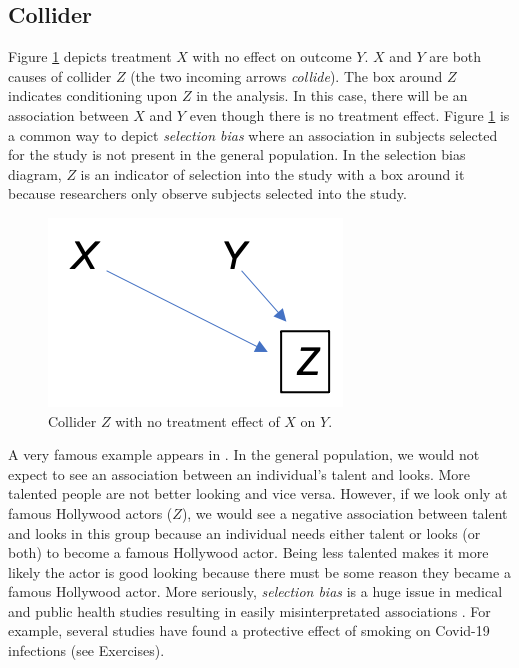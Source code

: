 \documentclass[]{book}
\begin{document}
\hypertarget{collider}{%
\subsection{Collider}\label{collider}}

Figure \ref{fig:collider} depicts treatment \(X\) with no effect on outcome \(Y\). \(X\) and \(Y\) are both causes of collider \(Z\) (the two incoming arrows \emph{collide}). The box around \(Z\) indicates conditioning upon \(Z\) in the analysis. In this case, there will be an association between \(X\) and \(Y\) even though there is no treatment effect. Figure \ref{fig:collider} is a common way to depict \emph{selection bias} where an association in subjects selected for the study is not present in the general population. In the selection bias diagram, \(Z\) is an indicator of selection into the study with a box around it because researchers only observe subjects selected into the study.

\begin{figure}
\centering
\includegraphics{./images/collider.png}
\caption{\label{fig:collider} Collider \(Z\) with no treatment effect of \(X\) on \(Y\).}
\end{figure}

A very famous example appears in \citet{pearl2018book}. In the general population, we would not expect to see an association between an individual's talent and looks. More talented people are not better looking and vice versa. However, if we look only at famous Hollywood actors (\(Z\)), we would see a negative association between talent and looks in this group because an individual needs either talent or looks (or both) to become a famous Hollywood actor. Being less talented makes it more likely the actor is good looking because there must be some reason they became a famous Hollywood actor. More seriously, \emph{selection bias} is a huge issue in medical and public health studies resulting in easily misinterpretated associations \citep{hernan2004structural, cole2010illustrating, elwert2014endogenous}. For example, several studies have found a protective effect of smoking on Covid-19 infections (see Exercises).
\end{document}

